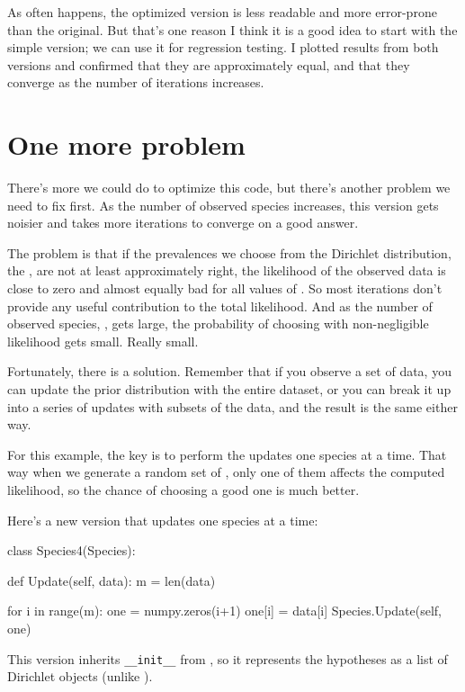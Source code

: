 \documentclass[12pt]{book}
\theoremstyle{exercise}
\begin{document}
As often happens, the optimized version is less readable and more
error-prone than the original.  But that's one reason I think it is
a good idea to start with the simple version; we can use it for
regression testing.  I plotted results from both versions and confirmed
that they are approximately equal, and that they converge as the
number of iterations increases.


\section{One more problem}

There's more we could do to optimize this code, but there's another
problem we need to fix first.  As the number of observed
species increases, this version gets noisier and takes more
iterations to converge on a good answer.

The problem is that if the prevalences we choose from the Dirichlet
distribution, the , are not at least approximately right,
the likelihood of the observed data is close to zero and almost
equally bad for all values of .  So most iterations don't
provide any useful contribution to the total likelihood.  And as the
number of observed species, , gets large, the probability of
choosing  with non-negligible likelihood gets small.  Really
small.

Fortunately, there is a solution.  Remember that if you observe
a set of data, you can update the prior distribution with the
entire dataset, or you can break it up into a series of updates
with subsets of the data, and the result is the same either way.

For this example, the key is to perform the updates one species at
a time.  That way when we generate a random set of , only
one of them affects the computed likelihood, so the chance of choosing
a good one is much better.

Here's a new version that updates one species at a time:

\begin{code}
class Species4(Species):

    def Update(self, data):
        m = len(data)

        for i in range(m):
            one = numpy.zeros(i+1)
            one[i] = data[i]            
            Species.Update(self, one)
\end{code}

This version inherits \verb"__init__" from , so it
represents the hypotheses as a list of Dirichlet objects (unlike
).
\end{document}
